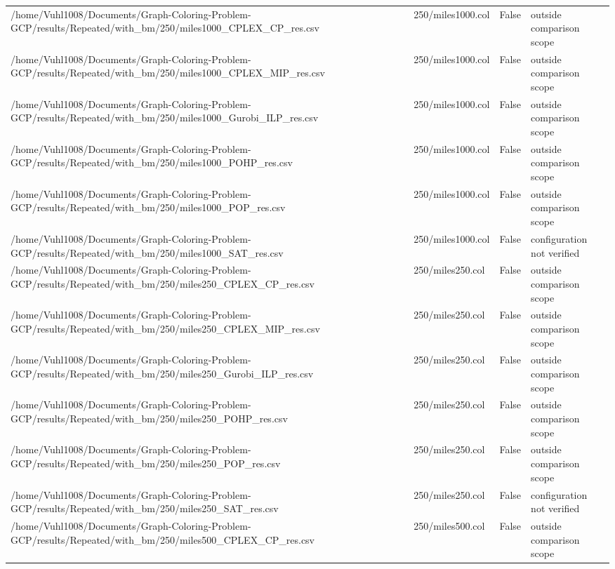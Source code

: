 \begin{table}[htbp]
\begin{tabular}{llll}
/home/Vuhl1008/Documents/Graph-Coloring-Problem-GCP/results/Repeated/with\_bm/250/miles1000\_CPLEX\_CP\_res.csv & 250/miles1000.col & False & outside comparison scope \\
/home/Vuhl1008/Documents/Graph-Coloring-Problem-GCP/results/Repeated/with\_bm/250/miles1000\_CPLEX\_MIP\_res.csv & 250/miles1000.col & False & outside comparison scope \\
/home/Vuhl1008/Documents/Graph-Coloring-Problem-GCP/results/Repeated/with\_bm/250/miles1000\_Gurobi\_ILP\_res.csv & 250/miles1000.col & False & outside comparison scope \\
/home/Vuhl1008/Documents/Graph-Coloring-Problem-GCP/results/Repeated/with\_bm/250/miles1000\_POHP\_res.csv & 250/miles1000.col & False & outside comparison scope \\
/home/Vuhl1008/Documents/Graph-Coloring-Problem-GCP/results/Repeated/with\_bm/250/miles1000\_POP\_res.csv & 250/miles1000.col & False & outside comparison scope \\
/home/Vuhl1008/Documents/Graph-Coloring-Problem-GCP/results/Repeated/with\_bm/250/miles1000\_SAT\_res.csv & 250/miles1000.col & False & configuration not verified \\
/home/Vuhl1008/Documents/Graph-Coloring-Problem-GCP/results/Repeated/with\_bm/250/miles250\_CPLEX\_CP\_res.csv & 250/miles250.col & False & outside comparison scope \\
/home/Vuhl1008/Documents/Graph-Coloring-Problem-GCP/results/Repeated/with\_bm/250/miles250\_CPLEX\_MIP\_res.csv & 250/miles250.col & False & outside comparison scope \\
/home/Vuhl1008/Documents/Graph-Coloring-Problem-GCP/results/Repeated/with\_bm/250/miles250\_Gurobi\_ILP\_res.csv & 250/miles250.col & False & outside comparison scope \\
/home/Vuhl1008/Documents/Graph-Coloring-Problem-GCP/results/Repeated/with\_bm/250/miles250\_POHP\_res.csv & 250/miles250.col & False & outside comparison scope \\
/home/Vuhl1008/Documents/Graph-Coloring-Problem-GCP/results/Repeated/with\_bm/250/miles250\_POP\_res.csv & 250/miles250.col & False & outside comparison scope \\
/home/Vuhl1008/Documents/Graph-Coloring-Problem-GCP/results/Repeated/with\_bm/250/miles250\_SAT\_res.csv & 250/miles250.col & False & configuration not verified \\
/home/Vuhl1008/Documents/Graph-Coloring-Problem-GCP/results/Repeated/with\_bm/250/miles500\_CPLEX\_CP\_res.csv & 250/miles500.col & False & outside comparison scope \\

\end{tabular}
\end{table}
